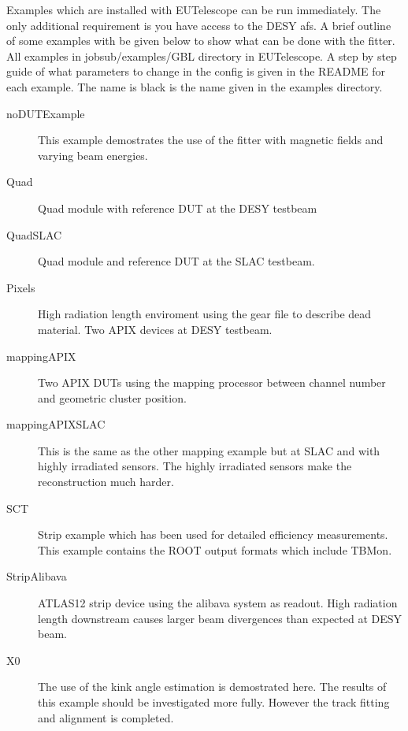 
Examples which are installed with EUTelescope can be run immediately. The only additional requirement is you have access to the DESY afs. A brief outline of some examples with be given below to show what can be done with the fitter. All examples in jobsub/examples/GBL directory in EUTelescope. A step by step guide of what parameters to change in the config is given in the README for each example. The name is black is the name given in the examples directory.

\begin{description} 
\item[noDUTExample] This example demostrates the use of the fitter with magnetic fields and varying beam energies.
\item[Quad] Quad module with reference DUT at the DESY testbeam 
\item[QuadSLAC]  Quad module and reference DUT at the SLAC testbeam.
\item[Pixels] High radiation length enviroment using the gear file to describe dead material. Two APIX devices at DESY testbeam.
\item[mappingAPIX] Two APIX DUTs using the mapping processor between channel number and geometric cluster position.
\item[mappingAPIXSLAC] This is the same as the other mapping example but at SLAC and with highly irradiated sensors. The highly irradiated sensors make the reconstruction much harder.
\item[SCT] Strip example which has been used for detailed efficiency measurements. This example contains the ROOT output formats which include TBMon.
\item[StripAlibava] ATLAS12 strip device using the alibava system as readout. High radiation length downstream causes larger beam divergences than expected at DESY beam.
\item[X0] The use of the kink angle estimation is demostrated here. The results of this example should be investigated more fully. However the track fitting and alignment is completed. 
\end{description} 